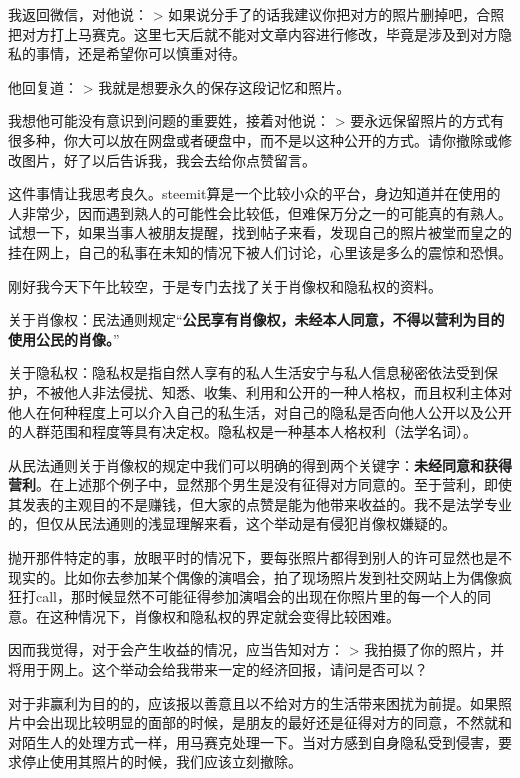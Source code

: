 \documentclass[]{ctexbook}
\begin{document}
我返回微信，对他说：
\textgreater{} 如果说分手了的话我建议你把对方的照片删掉吧，合照把对方打上马赛克。这里七天后就不能对文章内容进行修改，毕竟是涉及到对方隐私的事情，还是希望你可以慎重对待。

他回复道：
\textgreater{} 我就是想要永久的保存这段记忆和照片。

我想他可能没有意识到问题的重要姓，接着对他说：
\textgreater{} 要永远保留照片的方式有很多种，你大可以放在网盘或者硬盘中，而不是以这种公开的方式。请你撤除或修改图片，好了以后告诉我，我会去给你点赞留言。

这件事情让我思考良久。steemit算是一个比较小众的平台，身边知道并在使用的人非常少，因而遇到熟人的可能性会比较低，但难保万分之一的可能真的有熟人。试想一下，如果当事人被朋友提醒，找到帖子来看，发现自己的照片被堂而皇之的挂在网上，自己的私事在未知的情况下被人们讨论，心里该是多么的震惊和恐惧。

刚好我今天下午比较空，于是专门去找了关于肖像权和隐私权的资料。

关于肖像权：民法通则规定``\textbf{公民享有肖像权，未经本人同意，不得以营利为目的使用公民的肖像。}''

关于隐私权：隐私权是指自然人享有的私人生活安宁与私人信息秘密依法受到保护，不被他人非法侵扰、知悉、收集、利用和公开的一种人格权，而且权利主体对他人在何种程度上可以介入自己的私生活，对自己的隐私是否向他人公开以及公开的人群范围和程度等具有决定权。隐私权是一种基本人格权利（法学名词）。

从民法通则关于肖像权的规定中我们可以明确的得到两个关键字：\textbf{未经同意和获得营利}。在上述那个例子中，显然那个男生是没有征得对方同意的。至于营利，即使其发表的主观目的不是赚钱，但大家的点赞是能为他带来收益的。我不是法学专业的，但仅从民法通则的浅显理解来看，这个举动是有侵犯肖像权嫌疑的。

抛开那件特定的事，放眼平时的情况下，要每张照片都得到别人的许可显然也是不现实的。比如你去参加某个偶像的演唱会，拍了现场照片发到社交网站上为偶像疯狂打call，那时候显然不可能征得参加演唱会的出现在你照片里的每一个人的同意。在这种情况下，肖像权和隐私权的界定就会变得比较困难。

因而我觉得，对于会产生收益的情况，应当告知对方：
\textgreater{} 我拍摄了你的照片，并将用于网上。这个举动会给我带来一定的经济回报，请问是否可以？

对于非赢利为目的的，应该报以善意且以不给对方的生活带来困扰为前提。如果照片中会出现比较明显的面部的时候，是朋友的最好还是征得对方的同意，不然就和对陌生人的处理方式一样，用马赛克处理一下。当对方感到自身隐私受到侵害，要求停止使用其照片的时候，我们应该立刻撤除。
\end{document}
